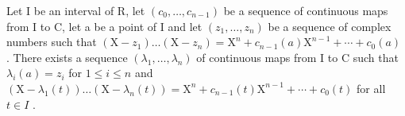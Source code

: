 Let I be an interval of R, let \((c_{0},\ldots,c_{n-1})\) be a sequence of continuous maps from I to C, let a be a point of I and let \((z_{1},\ldots,z_{n})\) be a sequence of complex numbers such that \((\mathrm{X}-z_{1})\ldots(\mathrm{X}-z_{n})=\mathrm{X}^{n}+c_{n-1}(a)\mathrm{X}^{n-1}+\cdots+c_{0}(a)\) . There exists a sequence \((\lambda_{1},\ldots,\lambda_{n})\) of continuous maps from I to C such that \(\lambda_{i}(a)=z_{i}\) for \(1\leqslant i\leqslant n\) and \((\mathrm{X}-\lambda_{1}(t))\ldots(\mathrm{X}-\lambda_{n}(t))=\mathrm{X}^{n}+c_{n-1}(t)\mathrm{X}^{n-1}+\cdots+c_{0}(t)\) for all \(t\in I\) .

